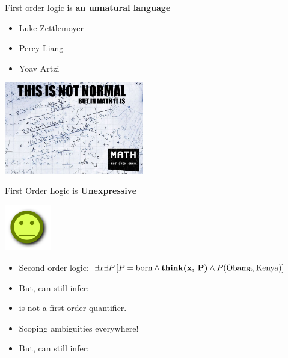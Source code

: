 \begin{frame}{First order logic is \textbf{an unnatural language}}

\begin{itemize}
\item[\checkmark] Luke Zettlemoyer
\item[\checkmark] Percy Liang
\item[\checkmark] Yoav Artzi
\end{itemize}
\vspace{1ex}

\begin{center}
  \includegraphics[height=4cm]{../img/math.jpg}
\end{center}
\end{frame}


\begin{frame}{First Order Logic is \textbf{Unexpressive}}
\begin{center}
  \includegraphics[height=2cm]{../img/pokerface.png}
\end{center}

\begin{itemize}
\item Second order logic: 
      $\exists x \exists P \left[ P = \textrm{born} \land \textbf{\textrm{think}(x, P)} \land P(\textrm{Obama}, \textrm{Kenya}) \right]$
\pause
\item But, can still infer: 
\end{itemize}
\vspace{1ex}
\pause


\begin{itemize}
\item {} is not a first-order quantifier.
\item Scoping ambiguities everywhere!
\pause
\item But, can still infer: 
\end{itemize}
\end{frame}


